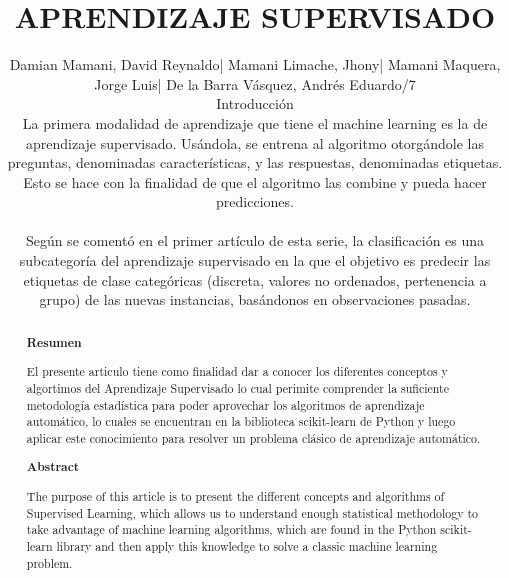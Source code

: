 \documentclass[%
 reprint,
 amsmath,amssymb,
 aps,
]{revtex4-1}
\begin{document}
\title{ APRENDIZAJE SUPERVISADO}
\author{Damian Mamani, David Reynaldo| Mamani Limache, Jhony| Mamani Maquera, Jorge Luis| De la Barra Vásquez, Andrés Eduardo/7
		
%

\begin{abstract}
\begin{center}
\textbf{Resumen}
\end{center}
El presente articulo tiene como finalidad dar a conocer los diferentes conceptos y algortimos del Aprendizaje Supervisado lo cual perimite comprender la suficiente metodología estadística para poder aprovechar los algoritmos de aprendizaje automático, lo cuales se encuentran en la biblioteca scikit-learn de Python y luego aplicar este conocimiento para resolver un problema clásico de aprendizaje automático.
\\

\begin{center}
\textbf{Abstract}
\end{center}
The purpose of this article is to present the different concepts and algorithms of Supervised Learning, which allows us to understand enough statistical methodology to take advantage of machine learning algorithms, which are found in the Python scikit-learn library and then apply this knowledge to solve a classic machine learning problem.
\\
\end{abstract}



\maketitle


\section {Introducción}\label{sec:1}
La primera modalidad de aprendizaje que tiene el machine learning es la de aprendizaje supervisado. Usándola, se entrena al algoritmo otorgándole las preguntas, denominadas características, y las respuestas, denominadas etiquetas. Esto se hace con la finalidad de que el algoritmo las combine y pueda hacer predicciones.\\\\
Según se comentó en el primer artículo de esta serie, la clasificación es una subcategoría del aprendizaje supervisado en la que el objetivo es predecir las etiquetas de clase categóricas (discreta, valores no ordenados, pertenencia a grupo) de las nuevas instancias, basándonos en observaciones pasadas.\\




}
\end{document}

